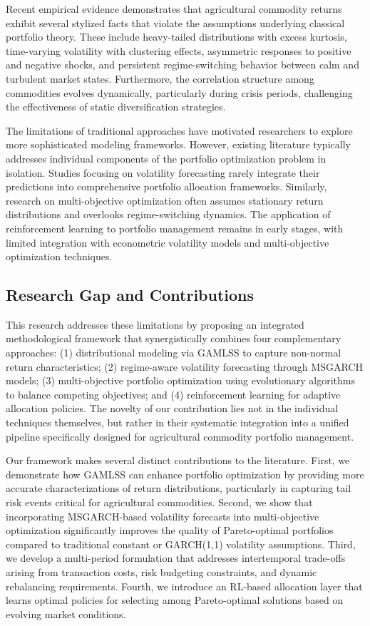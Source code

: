 \documentclass[
  10pt,
  a4paper,
]{article}
\begin{document}
Recent empirical evidence demonstrates that agricultural commodity
returns exhibit several stylized facts that violate the assumptions
underlying classical portfolio theory. These include heavy-tailed
distributions with excess kurtosis, time-varying volatility with
clustering effects, asymmetric responses to positive and negative
shocks, and persistent regime-switching behavior between calm and
turbulent market states. Furthermore, the correlation structure among
commodities evolves dynamically, particularly during crisis periods,
challenging the effectiveness of static diversification strategies.

The limitations of traditional approaches have motivated researchers to
explore more sophisticated modeling frameworks. However, existing
literature typically addresses individual components of the portfolio
optimization problem in isolation. Studies focusing on volatility
forecasting rarely integrate their predictions into comprehensive
portfolio allocation frameworks. Similarly, research on multi-objective
optimization often assumes stationary return distributions and overlooks
regime-switching dynamics. The application of reinforcement learning to
portfolio management remains in early stages, with limited integration
with econometric volatility models and multi-objective optimization
techniques.

\subsection{Research Gap and
Contributions}\label{research-gap-and-contributions}

This research addresses these limitations by proposing an integrated
methodological framework that synergistically combines four
complementary approaches: (1) distributional modeling via GAMLSS to
capture non-normal return characteristics; (2) regime-aware volatility
forecasting through MSGARCH models; (3) multi-objective portfolio
optimization using evolutionary algorithms to balance competing
objectives; and (4) reinforcement learning for adaptive allocation
policies. The novelty of our contribution lies not in the individual
techniques themselves, but rather in their systematic integration into a
unified pipeline specifically designed for agricultural commodity
portfolio management.

Our framework makes several distinct contributions to the literature.
First, we demonstrate how GAMLSS can enhance portfolio optimization by
providing more accurate characterizations of return distributions,
particularly in capturing tail risk events critical for agricultural
commodities. Second, we show that incorporating MSGARCH-based volatility
forecasts into multi-objective optimization significantly improves the
quality of Pareto-optimal portfolios compared to traditional constant or
GARCH(1,1) volatility assumptions. Third, we develop a multi-period
formulation that addresses intertemporal trade-offs arising from
transaction costs, risk budgeting constraints, and dynamic rebalancing
requirements. Fourth, we introduce an RL-based allocation layer that
learns optimal policies for selecting among Pareto-optimal solutions
based on evolving market conditions.
\end{document}
